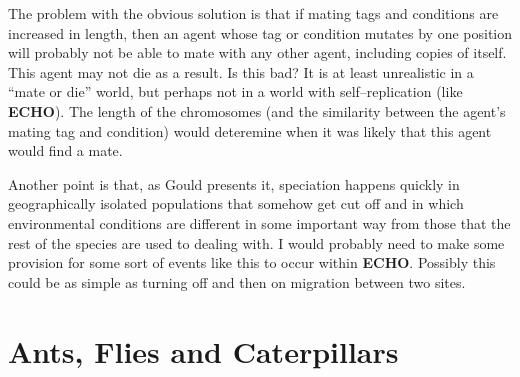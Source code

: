 The problem with the obvious solution is that if mating tags and
conditions are increased in length, then an agent whose tag or
condition mutates by one position will probably not be able to mate
with any other agent, including copies of itself. This agent may not 
die as a result. Is this bad? It is at least unrealistic in a ``mate
or die'' world, but perhaps not in a world with self--replication
(like {\bf ECHO}). The length of the chromosomes (and the similarity
between the agent's mating tag and condition) would deteremine when it
was likely that this agent would find a mate.

Another point is that, as Gould presents it, speciation happens
quickly in geographically isolated populations that somehow get cut
off and in which environmental conditions are different in some
important way from those that the rest of the species are used to
dealing with. I would probably need to make some provision for some
sort of events like this to occur within {\bf ECHO}. Possibly this
could be as simple as turning off and then on migration between two
sites.

\section{Ants, Flies and Caterpillars}



